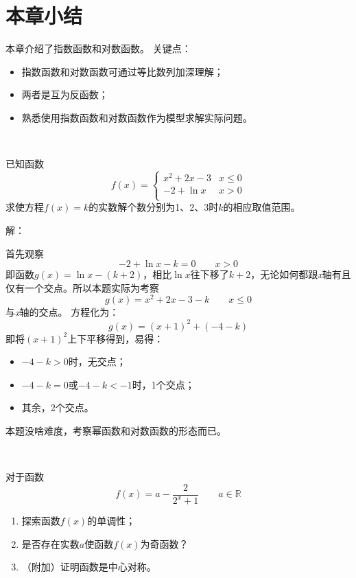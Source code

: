 \section{本章小结}

本章介绍了指数函数和对数函数。
关键点：
\begin{itemize}
    \item 指数函数和对数函数可通过等比数列加深理解；
    \item 两者是互为反函数；
    \item 熟悉使用指数函数和对数函数作为模型求解实际问题。
\end{itemize}

~

\begin{example}
已知函数
\[
f\left( x \right) =\begin{cases}
	x^2+2x-3 &x\leqslant 0\\
	-2+\ln x &x>0\\
\end{cases}
\]
求使方程$f\left( x \right) =k$的实数解个数分别为1、2、3时$k$的相应取值范围。
\end{example}

解：

首先观察
\[
-2+\ln x-k=0 \qquad x>0
\]
即函数$g\left( x \right) =\ln x-\left( k+2 \right) $，相比$\ln x$往下移了$k+2$，无论如何都跟{\it x}轴有且仅有一个交点。所以本题实际为考察
\[
g\left( x \right) =x^2+2x-3-k \qquad x\leqslant 0
\]
与{\it x}轴的交点。
方程化为：
\[
g\left( x \right) =\left( x+1 \right) ^2+\left( -4-k \right)
\]
即将$\left( x+1 \right) ^2$上下平移得到，易得：
\begin{itemize}
    \item $-4-k>0$时，无交点；
    \item $-4-k=0$或$-4-k<-1$时，1个交点；
    \item 其余，2个交点。
\end{itemize}

\begin{tcolorbox}
本题没啥难度，考察幂函数和对数函数的形态而已。
\end{tcolorbox}

~

\begin{example}
对于函数
\[
f\left( x \right) =a-\frac{2}{2^x+1} \qquad a\in \mathbb{R}
\]
\begin{enumerate}
    \item 探索函数$f\left( x \right) $的单调性；
    \item 是否存在实数$a$使函数$f\left( x \right) $为奇函数？
    \item （附加）证明函数是中心对称。
\end{enumerate}
\end{example}

